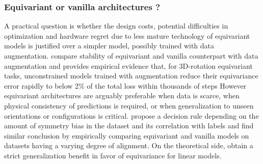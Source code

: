 \subsubsection{Equivariant or vanilla architectures ?}
A practical question is whether the design costs, potential difficulties in optimization and hardware regret due to less mature technology of equivariant models is justified over a simpler model, possibly trained with data augmentation.
\citet{nordenfors2024} compare stability of equivariant and vanilla counterpart with data augmentation and \citet{shen2026} provides empirical evidence that, for 3D-rotation equivariant tasks, unconstrained models trained with augmentation reduce their equivariance error rapidly to below 2\% of the total loss within thousands of steps
However equivariant architectures are arguably preferable when data is scarce, when physical consistency of predictions is required, or when generalization to unseen orientations or configurations is critical.
\citet{lawrence2026} propose a decision rule depending on the amount of symmetry bias in the dataset and its correlation with labels and \citet{rygiel2026} find similar conclusion by empirically comparing equivariant and vanilla models on datasets having a varying degree of alignment.
On the theoretical side, \citet{elesedy2021p3icml} obtain a strict generalization benefit in favor of equivariance for linear models.